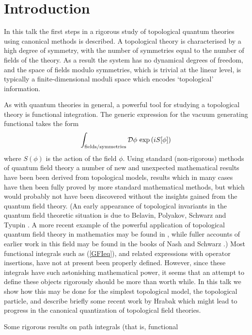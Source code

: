 \documentclass[a4paper,fleqn,12pt]{article}
\newcommand{\Dpath}{{\cal{D}}}
\begin{document}
 \section{Introduction}
%
In this talk the first steps in a rigorous study of topological
quantum theories using canonical methods is described. A
topological theory is characterised by a high degree of symmetry,
with the number of symmetries equal to the number of fields of the
theory. As a result the system has no dynamical degrees of
freedom, and the space of fields modulo symmetries, which is
trivial at the linear level, is typically a finite-dimensional
moduli space which encodes `topological' information.
 \par
As with quantum theories in general, a powerful  tool for studying
a topological theory is functional integration. The generic
expression for the vacuum generating functional takes the form
 \begin{equation}\label{GFIeq}
  \int_{{\rm fields}/{\rm symmetries}} \Dpath \phi \,
    \exp\left( i S[\phi] \right)
 \end{equation}
where  $S(\phi)$ is the action of the field $\phi$. Using standard
(non-rigorous) methods of quantum field theory a number of new and
unexpected mathematical results have been been derived from
topological models, results which in many cases have then been
fully proved by more standard mathematical methods, but which
would probably not have been discovered without the insights
gained from the quantum field theory. (An early appearance of
topological invariants in the quantum field theoretic situation is
due to Belavin, Polyakov, Schwarz and Tyupin \cite{BelPolSchTyu}.
A more recent example of the powerful application of topological
quantum field theory in mathematics may be found in
\cite{Witten94}, while fuller accounts of earlier work in this
field may be found in the books of Nash \cite{Nash} and Schwarz
\cite{Schwar93}.) Most functional integrals such as (\ref{GFIeq}),
and related expressions with operator insertions, have not at
present been properly defined. However, since these integrals have
such astonishing mathematical power, it seems that an attempt to
define these objects rigorously should be more than worth while.
In this talk we show how this may be done for the simplest
topological model, the topological particle, and describe briefly
some recent work by Hrabak \cite{Hrabak} which might lead to
progress in the canonical quantization of topological field
theories.
 \par
Some rigorous results on path integrals (that is, functional
\end{document}
